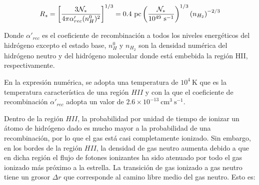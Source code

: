 



\begin{align}
  R_s = \left[\frac{3\mathcal{N}_*}{4\pi\alpha'_{rec}(n^0_H)^2}\right]^{1/3} = 0.4\mathrm{~pc}\left(\frac{\mathcal{N}_*}{10^{49}\mathrm{~s^{-1}}}\right)^{1/3}\left(n_{H_2}\right)^{-2/3} \label{eq:stromgren}
\end{align}

Donde $\alpha'_{rec}$ es el coeficiente de recombinación a todos los niveles energéticos del hidrógeno excepto el estado base, $n^0_H$ y $n_{H_2}$ son la densidad numérica del hidrógeno neutro y del hidrógeno molecular donde está embebida la región HII, respectivamente.

En la expresión numérica, se adopta una temperatura de $10^4\mathrm{~K}$ que es la temperatura característica de una región $HII$ y con la que el coeficiente de recombinación $\alpha'_{rec}$ adopta un valor de $2.6\times 10^{-13}\mathrm{~cm^3~s^{-1}}$.

Dentro de la región $HII$, la probabilidad por unidad de tiempo de ionizar un átomo de hidrógeno dado es mucho mayor a la probabilidad de una recombinación, por lo que el gas está casi completamente ionizado. Sin embargo, en los bordes de la región $HII$, la densidad de gas neutro aumenta debido a que en dicha región el flujo de fotones ionizantes ha sido atenuado por todo el gas ionizado más próximo a la estrella. La transición de gas ionizado a gas neutro tiene un grosor $\Delta r$ que corresponde al camino libre medio del gas neutro. Esto es:

